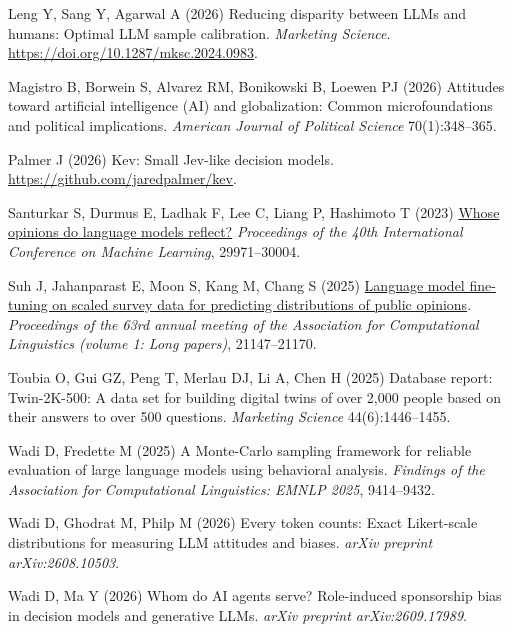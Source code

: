 \documentclass[
  11pt,
  letterpaper,
]{article}
\newlength{\cslhangindent}
\newenvironment{CSLReferences}[2] %
 {\begin{list}{}{%
  \setlength{\itemindent}{0pt}
  \setlength{\leftmargin}{0pt}
  \setlength{\parsep}{0pt}
  \ifodd #1
   \setlength{\leftmargin}{\cslhangindent}
   \setlength{\itemindent}{-1\cslhangindent}
  \fi
  \setlength{\itemsep}{#2\baselineskip}}}
 {\end{list}}
\begin{document}
\begin{CSLReferences}{1}{0}
Leng Y, Sang Y, Agarwal A (2026) Reducing disparity between {LLM}s and
humans: Optimal {LLM} sample calibration. \emph{Marketing Science}.
\url{https://doi.org/10.1287/mksc.2024.0983}.

Magistro B, Borwein S, Alvarez RM, Bonikowski B, Loewen PJ (2026)
Attitudes toward artificial intelligence (AI) and globalization: Common
microfoundations and political implications. \emph{American Journal of
Political Science} 70(1):348--365.

Palmer J (2026) Kev: Small {Jev}-like decision models.
\url{https://github.com/jaredpalmer/kev}.

Santurkar S, Durmus E, Ladhak F, Lee C, Liang P, Hashimoto T (2023)
\href{https://proceedings.mlr.press/v202/santurkar23a.html}{Whose
opinions do language models reflect?} \emph{Proceedings of the 40th
{International Conference on Machine Learning}}, 29971--30004.

Suh J, Jahanparast E, Moon S, Kang M, Chang S (2025)
\href{https://doi.org/10.18653/v1/2025.acl-long.1028}{Language model
fine-tuning on scaled survey data for predicting distributions of public
opinions}. \emph{Proceedings of the 63rd annual meeting of the
{A}ssociation for {C}omputational {L}inguistics (volume 1: Long
papers)}, 21147--21170.

Toubia O, Gui GZ, Peng T, Merlau DJ, Li A, Chen H (2025) Database
report: {Twin-2K-500}: A data set for building digital twins of over
2,000 people based on their answers to over 500 questions.
\emph{Marketing Science} 44(6):1446--1455.

Wadi D, Fredette M (2025) A {Monte-Carlo} sampling framework for
reliable evaluation of large language models using behavioral analysis.
\emph{Findings of the {Association for Computational Linguistics}:
{EMNLP} 2025}, 9414--9432.

Wadi D, Ghodrat M, Philp M (2026) Every token counts: Exact
{Likert}-scale distributions for measuring LLM attitudes and biases.
\emph{arXiv preprint arXiv:2608.10503}.

Wadi D, Ma Y (2026) Whom do AI agents serve? Role-induced sponsorship
bias in decision models and generative LLMs. \emph{arXiv preprint
arXiv:2609.17989}.


\end{CSLReferences}
\end{document}
